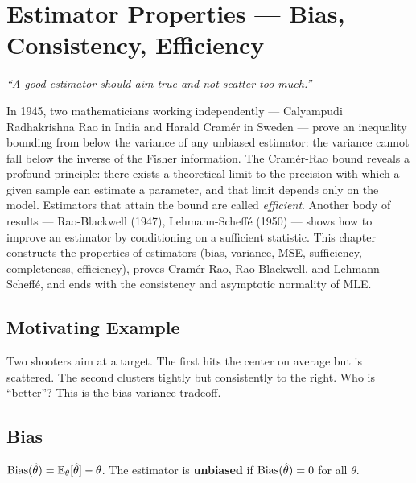 \chapter{Estimator Properties --- Bias, Consistency, Efficiency}
\label{ch:properties}

\begin{center}
\textit{``A good estimator should aim true and not scatter too much.''}
\end{center}

In 1945, two mathematicians working independently --- Calyampudi Radhakrishna Rao in India and Harald Cramér in Sweden --- prove an inequality bounding from below the variance of any unbiased estimator: the variance cannot fall below the inverse of the Fisher information. The Cramér-Rao bound reveals a profound principle: there exists a theoretical limit to the precision with which a given sample can estimate a parameter, and that limit depends only on the model. Estimators that attain the bound are called \emph{efficient}. Another body of results --- Rao-Blackwell (1947), Lehmann-Scheffé (1950) --- shows how to improve an estimator by conditioning on a sufficient statistic. This chapter constructs the properties of estimators (bias, variance, MSE, sufficiency, completeness, efficiency), proves Cramér-Rao, Rao-Blackwell, and Lehmann-Scheffé, and ends with the consistency and asymptotic normality of MLE.

\section{Motivating Example}

Two shooters aim at a target. The first hits the center on average but is scattered. The second clusters tightly but consistently to the right. Who is ``better''? This is the bias-variance tradeoff.

\section{Bias}

\begin{definition}[Bias]
$\operatorname{Bias}(\hat{\theta}) = \mathbb{E}_\theta[\hat{\theta}] - \theta$. The estimator is \textbf{unbiased} if $\operatorname{Bias}(\hat{\theta})=0$ for all $\theta$.
\end{definition}

